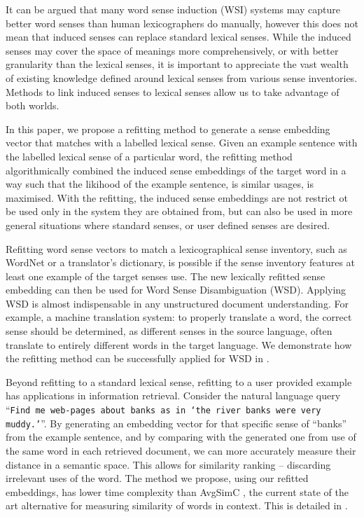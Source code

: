 \documentclass{sig-alternate}
\newcommand{\wordquote}[1]{\enquote{\texttt{#1}}}
\begin{document}
It can be argued that many word sense induction (WSI) systems may capture better word senses than human lexicographers do manually, however this does not mean that induced senses can replace standard lexical senses. While the induced senses may cover the space of meanings more comprehensively, or with better granularity than the lexical senses, it is important to appreciate the vast wealth of existing knowledge defined around lexical senses from various sense inventories. Methods to link induced senses to lexical senses allow us to take advantage of both worlds.


In this paper, we propose a refitting method to generate a sense embedding vector that matches with a labelled lexical sense.
Given an example sentence with the labelled lexical sense of a particular word, the refitting method algorithmically combined the induced sense embeddings of the target word in a way such that the likihood of the example sentence, is similar usages, is maximised.
With the refitting, the induced sense embeddings are not restrict ot be used only in the system they are obtained from, but can also be used in more general situations where standard senses, or user defined senses are desired.


Refitting word sense vectors to match a lexicographical sense inventory, such as WordNet or a translator's dictionary, is possible if the sense inventory features at least one example of the target senses use. The new lexically refitted sense embedding can then be used for Word Sense Disambiguation (WSD). 
Applying WSD is almost indispensable in any unstructured document understanding.
For example, a machine translation system: to properly translate a word, the correct sense should be determined, as different senses in the source language, often translate to entirely different words in the target language.
We demonstrate how the refitting method can be successfully applied for WSD in .

Beyond refitting to a standard lexical sense, refitting to a user provided example has applications in information retrieval. Consider the natural language query \wordquote{Find me web-pages about banks as in \enquote{the river banks were very muddy.}}. By generating an embedding vector for that specific sense of ``banks'' from the example sentence, and by comparing with the generated one from use of the same word in each retrieved document, we can more accurately measure their distance in a semantic space. This allows for similarity ranking -- discarding irrelevant uses of the word. The method we propose, using our refitted embeddings, has lower time complexity than AvgSimC \parencite{Reisinger2010}, the current state of the art alternative for measuring similarity of words in context. This is detailed in .
\end{document}
